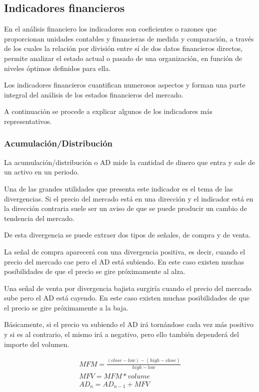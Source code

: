 \clearpage

\subsection{Indicadores financieros}
En el análisis financiero los indicadores son coeficientes o razones que proporcionan unidades contables y financieras de medida y comparación, a través de los cuales la relación por división entre sí de dos datos financieros directos, permite analizar el estado actual o pasado de una organización, en función de niveles óptimos definidos para ella.

Los indicadores financieros cuantifican numerosos aspectos y forman una parte integral del análisis de los estados financieros del mercado.

A continuación se procede a explicar algunos de los indicadores más representativos.

\subsubsection*{Acumulación/Distribución}

La acumulación/distribución o AD mide la cantidad de dinero que entra y sale de un activo en un periodo.

Una de las grandes utilidades que presenta este indicador es el tema de las divergencias. 
Si el precio del mercado está en una dirección y el indicador está en la dirección contraria suele ser un aviso  de que se puede producir un cambio de tendencia del mercado.

De esta divergencia se puede extraer dos tipos de señales, de compra y de venta.

La señal de compra aparecerá con una divergencia positiva, es decir, cuando el precio del mercado cae pero el AD está subiendo. En este caso existen muchas posibilidades de que el precio se gire próximamente al alza.

Una señal de venta por divergencia bajista surgiría cuando el precio del mercado sube pero el AD está cayendo. En este caso existen muchas posibilidades de que el precio se gire próximamente a la baja.

Básicamente, si el precio va subiendo el AD irá tornándose cada vez más positivo y si es al contrario, el mismo irá a negativo, pero ello también dependerá del importe del volumen.

\begin{gather*}
\label{eqn:AD}
MFM = \frac{(close - low) - (high - close)}{high - low} \\
MFV = MFM * volume \\
AD_n = AD_{n-1} + MFV\\
\end{gather*}

